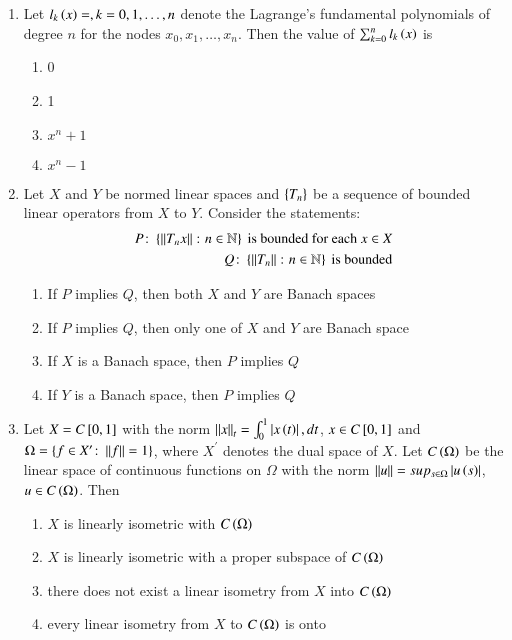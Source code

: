 \documentclass[journal]{IEEEtran}
\begin{document}
\begin{enumerate}
\item Let $l_k \left(x\right) =, k =0,1, \dots , n$ denote the Lagrange's fundamental polynomials of degree $n$ for the nodes $x_0, x_1, \dots , x_n$. Then the value of $\sum_{k=0}^{n} l_k \left(x\right)$ is
\begin{multicols}{2}
    \begin{enumerate}
        \item 0
        \item 1
        \item $x^n + 1$
        \item $x^n - 1$
    \end{enumerate}
\end{multicols}

\item Let $X$ and $Y$ be normed linear spaces and $\left\{T_n\right\}$ be a sequence of bounded linear operators from $X$ to $Y$. Consider the statements:
\begin{align*}
    P \colon \left\{\left\vert\left\vert T_n x\right\vert\right\vert \colon n \in \mathbb{N}\right\} \text{ is bounded for each } x \in X\\
    Q \colon \left\{\left\vert\left\vert T_n\right\vert\right\vert \colon n \in \mathbb{N}\right\} \text{ is bounded}
\end{align*}
    \begin{enumerate}
        \item If $P$ implies $Q$, then both $X$ and $Y$ are Banach spaces
        \item If $P$ implies $Q$, then only one of $X$ and $Y$ are Banach space
        \item If $X$ is a Banach space, then $P$ implies $Q$
        \item If $Y$ is a Banach space, then $P$ implies $Q$
    \end{enumerate}

\item Let $X = C{}\left[0,1\right]$ with the norm $\left\vert\left\vert x\right\vert\right\vert_t  = \int_0^1 \left\vert x\left(t\right)\right\vert, dt$, $x \in C {}\left[0,1\right]$ and $\Omega = \left\{f \in X^{\prime} \colon \left\vert\left\vert f\right\vert\right\vert = 1\right\}$, where $X^{\prime}$ denotes the dual space of $X$. Let $C\left(\Omega\right)$ be the linear space of continuous functions on $\Omega$ with the norm $\left\vert\left\vert u\right\vert\right\vert = sup _{s \in \Omega} \left\vert u\left(s\right)\right\vert$, $u \in C\left(\Omega\right)$. Then
    \begin{enumerate}
        \item $X$ is linearly isometric with $C\left(\Omega\right)$
        \item $X$ is linearly isometric with a proper subspace of $C\left(\Omega\right)$ 
        \item there does not exist a linear isometry from $X$ into $C\left(\Omega\right)$
        \item every linear isometry from $X$ to $C\left(\Omega\right)$ is onto
    \end{enumerate}


\end{enumerate}
\end{document}
